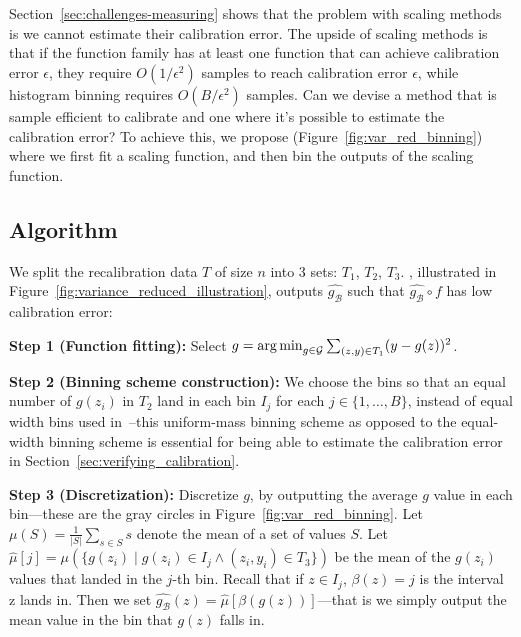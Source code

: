 \section{\Ourcal{}}
\label{sec:calibrating_models}

Section~\ref{sec:challenges-measuring} shows that the problem with scaling methods is we cannot estimate their calibration error. The upside of scaling methods is that if the function family  has at least one function that can achieve calibration error $\epsilon$, they require $O(1/\epsilon^2)$ samples to reach calibration error $\epsilon$, while histogram binning requires $O(B/\epsilon^2)$ samples. Can we devise a method that is sample efficient to calibrate and one where it's possible to estimate the calibration error?
To achieve this, we propose \ourcal{} (Figure~\ref{fig:var_red_binning}) where we first fit a scaling function, and then bin the outputs of the scaling function.

\subsection{Algorithm}

We split the recalibration data $T$ of size $n$ into 3 sets: $T_1$, $T_2$, $T_3$. \Ourcal{}, illustrated in Figure~\ref{fig:variance_reduced_illustration}, outputs $\hat{g_{\mathcal{B}}}$ such that $\hat{g_{\mathcal{B}}} \circ f$ has low calibration error:

\textbf{Step 1 (Function fitting):} Select $g = \operatorname*{arg\,min}_{g \in \mathcal{G}} \sum_{(z, y) \in T_1} (y - g(z))^2$.

\textbf{Step 2 (Binning scheme construction):} We choose the bins so that an equal number of $g(z_i)$ in $T_2$  land in each bin $I_j$ for each $j \in \{1, \dots, B\}$, instead of equal width bins used in~\cite{guo2017calibration}--this uniform-mass binning scheme as opposed to the equal-width binning scheme is essential for being able to estimate the calibration error in Section~\ref{sec:verifying_calibration}.

\textbf{Step 3 (Discretization):} Discretize $g$, by outputting the average $g$ value in each bin---these are the gray circles in Figure~\ref{fig:var_red_binning}. Let $\mu(S) = \frac{1}{|S|} \sum_{s \in S} s$ denote the mean of a set of values $S$.
Let $\hat{\mu}[j] = \mu(\{ g(z_i) \; | \; g(z_i) \in I_j \wedge (z_i, y_i) \in T_3 \})$ be the mean of the $g(z_i)$ values that landed in the $j$-th bin.
Recall that if $z \in I_j$,  $\beta(z) = j$ is the interval z lands in.
Then we set $\hat{g_{\mathcal{B}}}(z) = \hat{\mu}[\beta(g(z))]$---that is we simply output the mean value in the bin that $g(z)$ falls in.


